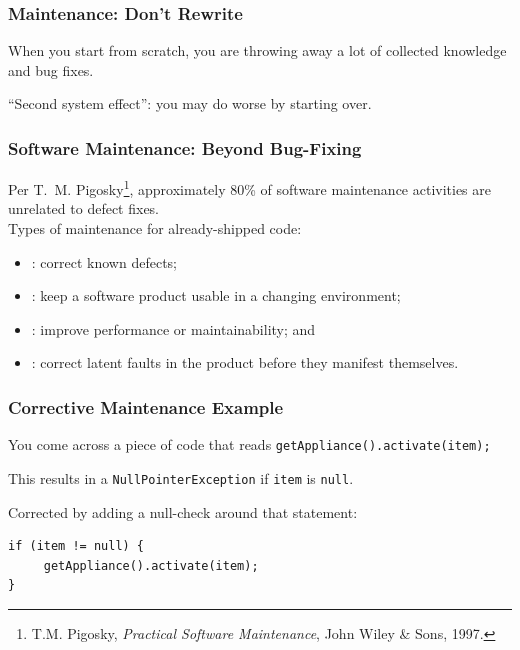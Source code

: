 \begin{frame}
\frametitle{Maintenance: Don't Rewrite}
\begin{changemargin}{1cm}

When you start from scratch, you are throwing away a lot of collected knowledge and bug fixes.

``Second system effect'': you may do worse by starting over. 

\end{changemargin}
\end{frame}


\begin{frame}
\frametitle{Software Maintenance: Beyond Bug-Fixing}
\begin{changemargin}{1cm}

Per T.~M. Pigosky\footnote{T.M. Pigosky,
  \emph{Practical Software Maintenance}, John Wiley \& Sons, 1997.},
approximately 80\% of software maintenance activities are unrelated to
defect fixes. \\[1em]

Types of maintenance for already-shipped code:
\begin{itemize}
\item {}: correct known defects;
\item {}: keep a software product usable in a changing environment;
\item {}: improve performance or maintainability; and
\item {}: correct latent faults in the product before they manifest themselves.
\end{itemize}
\end{changemargin}

\end{frame}

\begin{frame}[fragile]
\frametitle{Corrective Maintenance Example}
\begin{changemargin}{1cm}

You come across a piece of code that reads \texttt{getAppliance().activate(item);}

This results in a \texttt{NullPointerException} if \texttt{item} is \texttt{null}.

Corrected by adding a null-check around that statement:
\begin{verbatim} 
if (item != null) {
     getAppliance().activate(item);
}
\end{verbatim}


\end{changemargin}
\end{frame}

